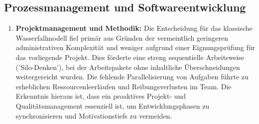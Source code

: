 \subsection{Prozessmanagement und Softwareentwicklung}
\begin{enumerate}
	\item \textbf{Projektmanagement und Methodik:} 
	Die Entscheidung für das klassische Wasserfallmodell fiel primär aus Gründen der vermeintlich geringeren administrativen Komplexität und weniger aufgrund einer Eignungsprüfung für das vorliegende Projekt. Dies förderte eine streng sequentielle Arbeitsweise ('Silo-Denken'), bei der Arbeitspakete ohne inhaltliche Überschneidungen weitergereicht wurden. Die fehlende Parallelisierung von Aufgaben führte zu erheblichen Ressourcenleerläufen und Reibungsverlusten im Team. Die Erkenntnis hieraus ist, dass ein proaktives Projekt- und Qualitätsmanagement essenziell ist, um Entwicklungsphasen zu synchronisieren und Motivationstiefs zu vermeiden.
	

\end{enumerate}

